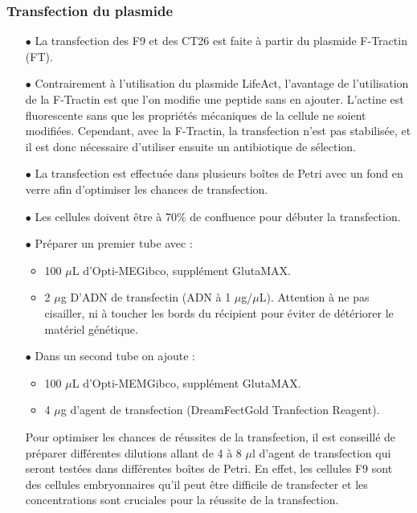 			\subsubsection*{Transfection du plasmide}
		\begin{itemize}
		\item[$\bullet$] La transfection des F9 et des CT26 est faite à partir du plasmide F-Tractin (FT).
		\item[$\bullet$] Contrairement à l'utilisation du plasmide LifeAct, l'avantage de l'utilisation de la F-Tractin est que l'on modifie une peptide sans en ajouter. L'actine est fluorescente sans que les propriétés mécaniques de la cellule ne soient modifiées. Cependant, avec la F-Tractin, la transfection n'est pas stabilisée, et il est donc nécessaire d'utiliser ensuite un antibiotique de sélection.  
		
		\item[$\bullet$] La transfection est effectuée dans plusieurs boîtes de Petri avec un fond en verre afin d'optimiser les chances de transfection. 
		
		\item[$\bullet$] Les cellules doivent être à 70\% de confluence pour débuter la transfection. 
		
		\item[$\bullet$] Préparer un premier tube avec :
			\begin{itemize}
			\item 100 $\mu$L d'Opti-ME\texttrademark Gibco\texttrademark, supplément GlutaMAX\texttrademark.
			\item 2 $\mu$g D'ADN de transfectin (ADN à 1 $\mu$g/$\mu$L). Attention à ne pas cisailler, ni à toucher les bords du récipient pour éviter de détériorer le matériel génétique. 
		\end{itemize}	
		\item[$\bullet$] Dans un second tube on ajoute : 
		\begin{itemize}
			\item 100 $\mu$L d'Opti-MEM\texttrademark Gibco\texttrademark, supplément GlutaMAX\texttrademark.
			\item 4 $\mu$g d'agent de transfection (DreamFect\texttrademark Gold Tranfection Reagent).
		\end{itemize}	
		Pour optimiser les chances de réussites de la transfection, il est conseillé de préparer différentes dilutions allant de 4 à 8 $\mu$l d'agent de transfection qui seront testées dans différentes boîtes de Petri. En effet, les cellules F9 sont des cellules embryonnaires qu'il peut être difficile de transfecter et les concentrations sont cruciales pour la réussite de la transfection. 
		

\end{itemize}
